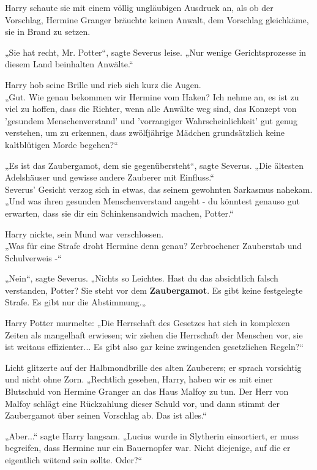 {Harry schaute sie mit einem völlig ungläubigen Ausdruck an, als ob der Vorschlag, Hermine Granger bräuchte keinen Anwalt, dem Vorschlag gleichkäme, sie in Brand zu setzen.

„Sie hat recht, Mr. Potter“, sagte Severus leise. „Nur wenige Gerichtsprozesse in diesem Land beinhalten Anwälte.“

Harry hob seine Brille und rieb sich kurz die Augen.\\ „Gut. Wie genau bekommen wir Hermine vom Haken? Ich nehme an, es ist zu viel zu hoffen, dass die Richter, wenn alle Anwälte weg sind, das Konzept von 'gesundem Menschenverstand' und 'vorrangiger Wahrscheinlichkeit' gut genug verstehen, um zu erkennen, dass zwölfjährige Mädchen grundsätzlich keine kaltblütigen Morde begehen?“

„Es ist das Zaubergamot, dem sie gegenübersteht“, sagte Severus. „Die ältesten Adelshäuser und gewisse andere Zauberer mit Einfluss.“\\ Severus' Gesicht verzog sich in etwas, das seinem gewohnten Sarkasmus nahekam. „Und was ihren gesunden Menschenverstand angeht - du könntest genauso gut erwarten, dass sie dir ein Schinkensandwich machen, Potter.“

Harry nickte, sein Mund war verschlossen.\\ „Was für eine Strafe droht Hermine denn genau? Zerbrochener Zauberstab und Schulverweis -“

„Nein“, sagte Severus. „Nichts so Leichtes. Hast du das absichtlich falsch verstanden, Potter? Sie steht vor dem \textbf{Zaubergamot}. Es gibt keine festgelegte Strafe. Es gibt nur die Abstimmung.„

Harry Potter murmelte: „Die Herrschaft des Gesetzes hat sich in komplexen Zeiten als mangelhaft erwiesen; wir ziehen die Herrschaft der Menschen vor, sie ist weitaus effizienter... Es gibt also gar keine zwingenden gesetzlichen Regeln?“

Licht glitzerte auf der Halbmondbrille des alten Zauberers; er sprach vorsichtig und nicht ohne Zorn. „Rechtlich gesehen, Harry, haben wir es mit einer Blutschuld von Hermine Granger an das Haus Malfoy zu tun. Der Herr von Malfoy schlägt eine Rückzahlung dieser Schuld vor, und dann stimmt der Zaubergamot über seinen Vorschlag ab. Das ist alles.“

„Aber...“ sagte Harry langsam. „Lucius wurde in Slytherin einsortiert, er muss begreifen, dass Hermine nur ein Bauernopfer war. Nicht diejenige, auf die er eigentlich wütend sein sollte. Oder?“

}
